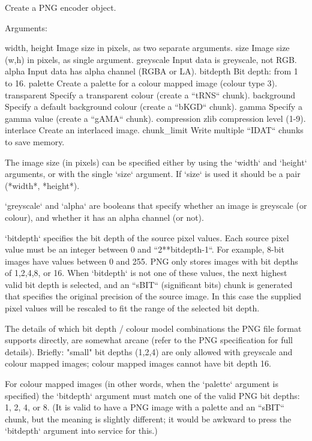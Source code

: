 \begin{DoxyVerb}Create a PNG encoder object.

Arguments:

width, height
  Image size in pixels, as two separate arguments.
size
  Image size (w,h) in pixels, as single argument.
greyscale
  Input data is greyscale, not RGB.
alpha
  Input data has alpha channel (RGBA or LA).
bitdepth
  Bit depth: from 1 to 16.
palette
  Create a palette for a colour mapped image (colour type 3).
transparent
  Specify a transparent colour (create a ``tRNS`` chunk).
background
  Specify a default background colour (create a ``bKGD`` chunk).
gamma
  Specify a gamma value (create a ``gAMA`` chunk).
compression
  zlib compression level (1-9).
interlace
  Create an interlaced image.
chunk_limit
  Write multiple ``IDAT`` chunks to save memory.

The image size (in pixels) can be specified either by using the
`width` and `height` arguments, or with the single `size`
argument.  If `size` is used it should be a pair (*width*,
*height*).

`greyscale` and `alpha` are booleans that specify whether
an image is greyscale (or colour), and whether it has an
alpha channel (or not).

`bitdepth` specifies the bit depth of the source pixel values.
Each source pixel value must be an integer between 0 and
``2**bitdepth-1``.  For example, 8-bit images have values
between 0 and 255.  PNG only stores images with bit depths of
1,2,4,8, or 16.  When `bitdepth` is not one of these values,
the next highest valid bit depth is selected, and an ``sBIT``
(significant bits) chunk is generated that specifies the original
precision of the source image.  In this case the supplied pixel
values will be rescaled to fit the range of the selected bit depth.

The details of which bit depth / colour model combinations the
PNG file format supports directly, are somewhat arcane
(refer to the PNG specification for full details).  Briefly:
"small" bit depths (1,2,4) are only allowed with greyscale and
colour mapped images; colour mapped images cannot have bit depth
16.

For colour mapped images (in other words, when the `palette`
argument is specified) the `bitdepth` argument must match one of
the valid PNG bit depths: 1, 2, 4, or 8.  (It is valid to have a
PNG image with a palette and an ``sBIT`` chunk, but the meaning
is slightly different; it would be awkward to press the
`bitdepth` argument into service for this.)


\end{DoxyVerb}
